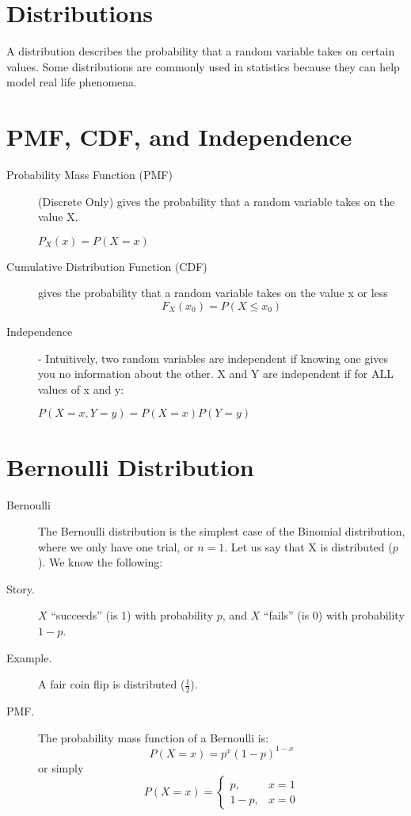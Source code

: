 \documentclass[11pt]{article}
\begin{document}
\begin{notes}
\section*{Distributions}
A distribution describes the probability that a random variable takes on certain values. Some distributions are commonly used in statistics because they can help model real life phenomena.

\section*{PMF, CDF, and Independence}
\begin{description}

\item[Probability Mass Function (PMF)] (Discrete Only) gives the probability that a random variable takes on the value X.
\begin{center}
$P_X(x) = P(X=x)$
\end{center}

\item[Cumulative Distribution Function (CDF)] gives the probability that a random variable takes on the value x or less
\[F_X(x_0) = P(X \leq x_0)\]

\item[Independence] - Intuitively, two random variables are independent if knowing one gives you no information about the other. X and Y are independent if for ALL values of x and y:  
\begin{center}
$P(X=x, Y=y) = P(X = x)P(Y = y)$
\end{center}
\end{description}

\section*{Bernoulli Distribution}
\begin{description}
    \item[Bernoulli] The Bernoulli distribution is the simplest case of the Binomial distribution, where we only have one trial, or $n=1$. Let us say that X is distributed \Bern($p$). We know the following:
	\item[Story.] $X$ ``succeeds'' (is 1) with probability $p$, and $X$ ``fails'' (is 0) with probability $1-p$.
	\item[Example.] A fair coin flip is distributed \Bern($\frac{1}{2}$).
	\item[PMF.] The probability mass function of a Bernoulli is:
\[P(X = x) = p^x(1-p)^{1-x}\]
or simply
\[P(X = x) = \begin{cases} p, & x = 1 \\ 1-p, & x = 0 \end{cases}\]
\end{description}


\end{notes}
\end{document}
